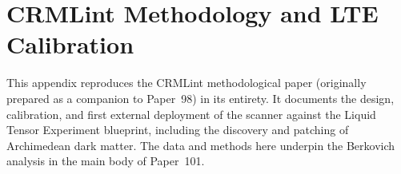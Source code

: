 \documentclass[11pt,a4paper]{article}
\theoremstyle{plain}
\theoremstyle{definition}
\begin{document}
\clearpage
\section{CRMLint Methodology and LTE Calibration}\label{app:methodology}

This appendix reproduces the CRMLint methodological paper (originally
prepared as a companion to Paper~98) in its entirety.  It documents
the design, calibration, and first external deployment of the scanner
against the Liquid Tensor Experiment blueprint, including the discovery
and patching of Archimedean dark matter.  The data and methods here
underpin the Berkovich analysis in the main body of Paper~101.


\end{document}

